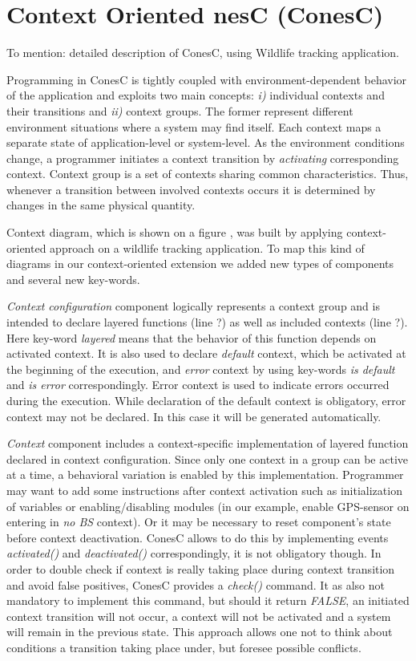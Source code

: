 \section{Context Oriented nesC (ConesC)}
To mention: detailed description of ConesC, using Wildlife tracking application.

Programming in ConesC is tightly coupled with environment-dependent behavior of the application and exploits two main concepts: \emph{i)} individual contexts and their transitions and \emph{ii)} context groups. The former represent different environment situations where a system may find itself. Each context maps a separate state of application-level or system-level. As the environment conditions change, a programmer initiates a context transition by \emph{activating} corresponding context. Context group is a set of contexts sharing common characteristics. Thus, whenever a transition between involved contexts occurs it is determined by changes in the same physical quantity.

Context diagram, which is shown on a figure %
, was built by applying context-oriented approach on a wildlife tracking application. To map this kind of diagrams in our context-oriented extension we added new types of components and several new key-words.

\emph{Context configuration} component logically represents a context group and is intended to declare layered functions (line ?) as well as included contexts (line ?). Here key-word \emph{layered} means that the behavior of this function depends on activated context. It is also used to declare \emph{default} context, which be activated at the beginning of the execution, and \emph{error} context by using key-words \emph{is default} and \emph{is error} correspondingly. Error context is used to indicate errors occurred during the execution. While declaration of the default context is obligatory, error context may not be declared. In this case it will be generated automatically.

\emph{Context} component includes a context-specific implementation of layered function declared in context configuration. Since only one context in a group can be active at a time, a behavioral variation is enabled by this implementation. Programmer may want to add some instructions after context activation such as initialization of variables or enabling/disabling modules (in our example, enable GPS-sensor on entering in \emph{no BS} context). Or it may be necessary to reset component's state before context deactivation. ConesC allows to do this by implementing events \emph{activated()} and \emph{deactivated()} correspondingly, it is not obligatory though. In order to double check if context is really taking place during context transition and avoid false positives, ConesC provides a \emph{check()} command. It as also not mandatory to implement this command, but should it return \emph{FALSE}, an initiated context transition will not occur, a context will not be activated and a system will remain in the previous state. This approach allows one not to think about conditions a transition taking place under, but foresee possible conflicts.

